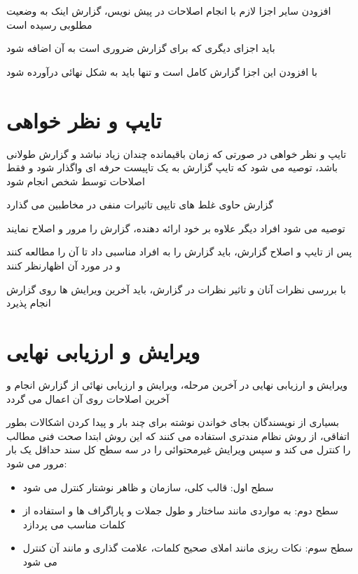 \documentclass[14pt]{beamer}
\makeatletter
\newcommand{\rtlist}{\raggedleft\rightskip\@totalleftmargin}
\newcommand{\sectionfontsize}{\fontsize{22pt}{0pt}\selectfont}
\newcommand{\framefontsizelarge}{\fontsize{18pt}{0pt}\selectfont}
\newcommand{\frametitlefontsize}{\fontsize{20pt}{0pt}\selectfont}
\makeatother
\begin{document}
\begin{persian}
	\begin{frame}[plain]{\frametitlefontsize افزودن سایر اجزا لازم}
		\framefontsizelarge
		با انجام اصلاحات در پیش نویس، گزارش اینک به وضعیت مطلوبی رسیده است
		
		باید اجزای دیگری که برای گزارش ضروری است به آن اضافه شود
		
		با افزودن این اجزا گزارش کامل است و تنها باید به شکل نهائی درآورده شود
	\end{frame}	
	
	\section{\sectionfontsize تایپ و نظر خواهی}
	
	\begin{frame}[plain]{\frametitlefontsize تایپ و نظر خواهی}
		\framefontsizelarge
		در صورتی که زمان باقیمانده چندان زیاد نباشد و گزارش طولانی باشد، توصیه می شود که تایپ گزارش به یک تاپیست حرفه ای واگذار شود و فقط اصلاحات توسط شخص انجام شود
		
		گزارش حاوی غلط های تایپی تاثیرات منفی در مخاطبین می گذارد
		
		توصیه می شود افراد دیگر علاوه بر خود ارائه دهنده، گزارش را مرور و اصلاح نمایند
		
		پس از تایپ و اصلاح گزارش، باید گزارش را به افراد مناسبی داد تا آن را مطالعه کنند و در مورد آن اظهارنظر کنند
		
		با بررسی نظرات آنان و تاثیر نظرات در گزارش، باید آخرین ویرایش ها روی گزارش انجام پذیرد
	\end{frame}
	
	\section{\sectionfontsize ویرایش و ارزیابی نهایی}
	
	\begin{frame}[plain]{\frametitlefontsize ویرایش و ارزیابی نهایی}
		\framefontsizelarge
		در آخرین مرحله، ویرایش و ارزیابی نهائی از گزارش انجام و آخرین اصلاحات روی آن اعمال می گردد
		
		بسیاری از نویسندگان بجای خواندن نوشته برای چند بار و پیدا کردن اشکالات بطور اتفاقی، از روش نظام
		مندتری استفاده می کنند که این روش ابتدا صحت فنی مطالب را کنترل می کند و سپس ویرایش
		غیرمحتوائی را در سه سطح کل سند حداقل یک بار مرور می شود:
		\begin{itemize}\rtlist
			\item سطح اول: قالب کلی، سازمان و ظاهر نوشتار کنترل می شود
			\item سطح دوم: به مواردی مانند ساختار و طول جملات و پاراگراف ها و استفاده از کلمات مناسب می پردازد
			\item سطح سوم: نکات ریزی مانند املای صحیح کلمات، علامت گذاری و مانند آن کنترل می شود
		\end{itemize}
	\end{frame}

\end{persian}
\end{document}
